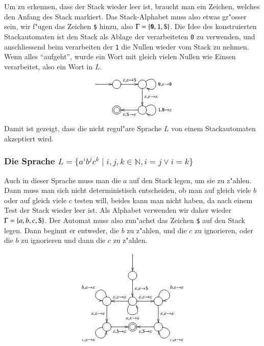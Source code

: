 Um zu erkennen, dass der Stack wieder leer ist, braucht man ein Zeichen,
welches den Anfang des Stack markiert. Das Stack-Alphabet muss also 
etwas gr"osser sein, wir f"ugen das Zeichen {\tt \$} hinzu, also
$\Gamma=\{{\tt 0},{\tt 1},{\tt \$}\}$.
Die Idee des konstruierten Stackautomaten ist den Stack als Ablage der
verarbeiteten {\tt 0} zu verwenden, und anschliessend beim verarbeiten
der  {\tt 1} die Nullen wieder vom Stack zu nehmen. Wenn alles ``aufgeht'',
wurde ein Wort mit gleich vielen Nullen wie Einsen verarbeitet, also 
ein Wort in $L$.
\[
\entrymodifiers={++[o][F]}
\xymatrix{
*+\txt{}\ar[r]
	&{}\ar[r]^{\varepsilon,\varepsilon\to{\tt \$}}
		&{} \ar@(ur,dr)^{{\tt 0},\varepsilon\to{\tt 0}}
		    \ar[d]^{\varepsilon,\varepsilon\to\varepsilon}
\\
*+\txt{}
	&*++[o][F=]{}
		&{}\ar[l]^{\varepsilon,{\tt \$}\to\varepsilon}
		   \ar@(ur,dr)^{{\tt 1},{\tt 0}\to\varepsilon}
}
\]
Damit ist gezeigt, dass die nicht regul"are Sprache $L$ von einem Stackautomaten
akzeptiert wird.

\subsubsection{Die Sprache $L=\{a^ib^jc^k\;|\;i,j,k\in\mathbb N, i=j\vee i=k\}$}
Auch in dieser Sprache muss man die $a$ auf den Stack legen, um sie
zu z"ahlen. Dann muss man sich nicht deterministisch entscheiden,
ob man auf gleich viele $b$ oder auf gleich viele $c$ testen will,
beides kann man nicht haben, da nach einem Test der Stack wieder leer
ist. Als Alphabet verwenden wir daher wieder $\Gamma=\{a,b,c,{\tt\$}\}$.
Der Automat muss also zun"achst das Zeichen {\tt\$} auf den Stack legen.
Dann beginnt er entweder, die $b$ zu z"ahlen, und die $c$ zu ignorieren,
oder die $b$ zu ignorieren und dann die $c$ zu z"ahlen.
\[
\entrymodifiers={++[o][F]}
\xymatrix{
*+\txt{}
	&*+\txt{}\ar[d]
\\
*+\txt{}
	&{}\ar[d]^{\varepsilon,\varepsilon\to{\tt\$}}
\\
{}\ar@(u,l)_{b,a\to\varepsilon}
  \ar[d]_{\varepsilon,\varepsilon\to\varepsilon}
	&{}\ar@(dl,dr)_{a,\varepsilon\to a}
	   \ar[l]_{\varepsilon,\varepsilon\to\varepsilon}
	   \ar[r]^{\varepsilon,\varepsilon\to\varepsilon}
		&{}\ar@(u,r)^{b,\varepsilon\to\varepsilon}
		   \ar[d]^{\varepsilon,\varepsilon\to\varepsilon}
\\
{}\ar@(l,d)_{c,\varepsilon\to\varepsilon}
  \ar[r]_{\varepsilon,{\tt\$}\to\varepsilon}
	&*++[o][F=]{}
		&\ar@(r,d)^{c,a\to\varepsilon}
		  \ar[l]^{\varepsilon,{\tt\$}\to\varepsilon}
}
\]

